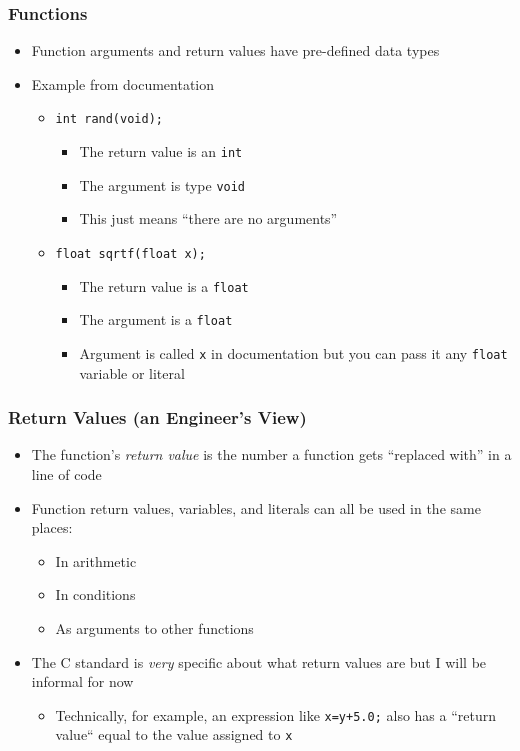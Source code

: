 \documentclass[14pt]{beamer}
\begin{document}
\begin{frame}
\frametitle{Functions}
\begin{itemize}
\item Function arguments and return values have pre-defined data types
\pause
\item Example from documentation
\begin{itemize}
\item \texttt{int~rand(void);}
	\begin{itemize}
		\item The return value is an \texttt{int}
		\item The argument is type \texttt{void}
		\item This just means ``there are no arguments''
	\end{itemize}
\pause
\item \texttt{float sqrtf(float x);}
	\begin{itemize}
		\item The return value is a \texttt{float}
		\item The argument is a \texttt{float}
		\item Argument is called \texttt{x} in documentation but you can pass it any \texttt{float} variable or literal
	\end{itemize}
\end{itemize}
\end{itemize}
\end{frame}

\begin{frame}
\frametitle{Return Values (an Engineer's View)}
\begin{itemize}
\item The function's \textit{return value} is the number a function gets ``replaced with'' in a line of code
\pause
\item Function return values, variables, and literals can all be used in the same places:
	\begin{itemize}
		\item In arithmetic
		\item In conditions
		\item As arguments to other functions
	\end{itemize}	 
\pause
\item The C standard is \textit{very} specific about what return values are but I will be informal for now
	\begin{itemize}
		\item Technically, for example, an expression like \texttt{x=y+5.0;} also has a ``return value`` equal to the value assigned to \texttt{x}
	\end{itemize}
\end{itemize}
\end{frame}
\end{document}
